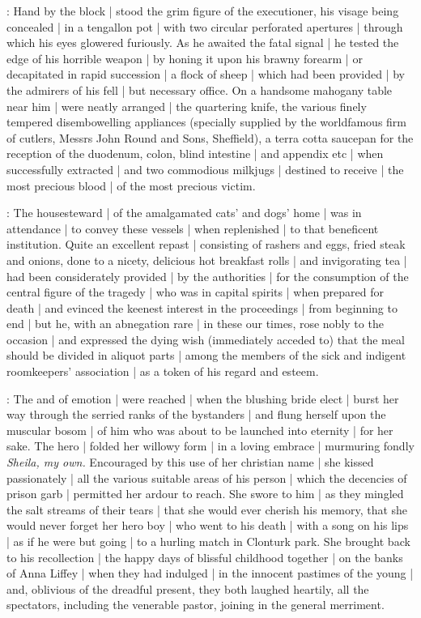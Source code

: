 :
Hand by the block |
stood the grim figure of the executioner,
his visage being concealed |
in a tengallon pot |
with two circular perforated apertures |
through which his eyes glowered furiously.
As he awaited the fatal signal |
he tested the edge of his horrible weapon |
by honing it upon his brawny forearm |
or decapitated in rapid succession |
a flock of sheep |
which had been provided |
by the admirers of his fell |
but necessary office.
On a handsome mahogany table near him |
were neatly arranged |
the quartering knife,
the various finely tempered disembowelling appliances
(specially supplied by the worldfamous firm of cutlers,
Messrs John Round and Sons,
Sheffield),
a terra cotta saucepan for the reception of the duodenum,
colon,
blind intestine |
and appendix etc |
when successfully extracted |
and two commodious milkjugs |
destined to receive |
the most precious blood |
of the most precious victim.

:
The housesteward |
of the amalgamated cats' and dogs' home |
was in attendance |
to convey these vessels |
when replenished |
to that beneficent institution.
Quite an excellent repast |
consisting of rashers and eggs,
fried steak and onions,
done to a nicety,
delicious hot breakfast rolls |
and invigorating tea |
had been considerately provided |
by the authorities |
for the consumption of the central figure of the tragedy |
who was in capital spirits |
when prepared for death |
and evinced the keenest interest in the proceedings |
from beginning to end |
but he,
with an abnegation rare |
in these our times,
rose nobly to the occasion |
and expressed the dying wish
(immediately acceded to)
that the meal should be divided in aliquot parts |
among the members of the sick and indigent roomkeepers' association |
as a token of his regard and esteem.

:
The  and  of emotion |
were reached |
when the blushing bride elect |
burst her way through the serried ranks of the bystanders |
and flung herself upon the muscular bosom |
of him who was about to be launched into eternity |
for her sake.
The hero |
folded her willowy form |
in a loving embrace |
murmuring fondly
\emph{Sheila,
my own.}
Encouraged by this use of her christian name |
she kissed passionately |
all the various suitable areas of his person |
which the decencies of prison garb |
permitted her ardour to reach.
She swore to him |
as they mingled the salt streams of their tears |
that she would ever cherish his memory,
that she would never forget her hero boy |
who went to his death |
with a song on his lips |
as if he were but going |
to a hurling match in Clonturk park.
She brought back to his recollection |
the happy days of blissful childhood together |
on the banks of Anna Liffey |
when they had indulged |
in the innocent pastimes of the young |
and,
oblivious of the dreadful present,
they both laughed heartily,
all the spectators,
including the venerable pastor,
joining in the general merriment.

